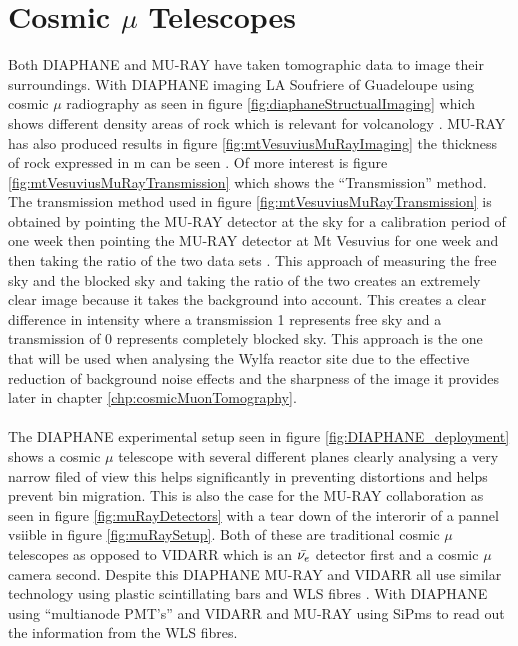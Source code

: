 \section{Cosmic $\mu$ Telescopes} \label{sec:cosmicMuTelescopes}
Both DIAPHANE and MU-RAY have taken tomographic data to image their surroundings. With DIAPHANE imaging LA Soufriere of Guadeloupe using cosmic $\mu$ radiography as seen in figure \ref{fig:diaphaneStructualImaging} which shows different density areas of rock which is relevant for volcanology \cite{Marteau_2017}. MU-RAY has also produced results in figure \ref{fig:mtVesuviusMuRayImaging} the thickness of rock expressed in m can be seen \cite{Ambrosino_2014}. Of more interest is figure \ref{fig:mtVesuviusMuRayTransmission} which shows the ``Transmission'' method. The transmission method used in figure \ref{fig:mtVesuviusMuRayTransmission} is obtained by pointing the MU-RAY detector at the sky for a calibration period of one week then pointing the MU-RAY detector at Mt Vesuvius for one week and then taking the ratio of the two data sets \cite{Ambrosino_2014}. This approach of measuring the free sky and the blocked sky and taking the ratio of the two creates an extremely clear image because it takes the background into account. This creates a clear difference in intensity where a transmission 1 represents free sky and a transmission of 0 represents completely blocked sky. This approach is the one that will be used when analysing the Wylfa reactor site due to the effective reduction of background noise effects and the sharpness of the image it provides later in chapter \ref{chp:cosmicMuonTomography}. 
\\\\The DIAPHANE experimental setup seen in figure \ref{fig:DIAPHANE_deployment} shows a cosmic $\mu$ telescope with several different planes clearly analysing a very narrow filed of view this helps significantly in preventing distortions and helps prevent bin migration. This is also the case for the MU-RAY collaboration as seen in figure \ref{fig:muRayDetectors} with a tear down of the interorir of a pannel vsiible in figure \ref{fig:muRaySetup}. Both of these are traditional cosmic $\mu$ telescopes as opposed to VIDARR which is an $\Bar{\nu_e}$ detector first and a cosmic $\mu$ camera second. Despite this DIAPHANE MU-RAY and VIDARR all use similar technology using plastic scintillating bars and WLS fibres \cite{Carroll_2018} \cite{Marteau_2017} \cite{ANASTASIO2013423}. With DIAPHANE using ``multianode PMT’s''  \cite{Marteau_2017} and VIDARR and MU-RAY using SiPms \cite{Carroll_2018} \cite{ANASTASIO2013423} to read out the information from the WLS fibres. 


